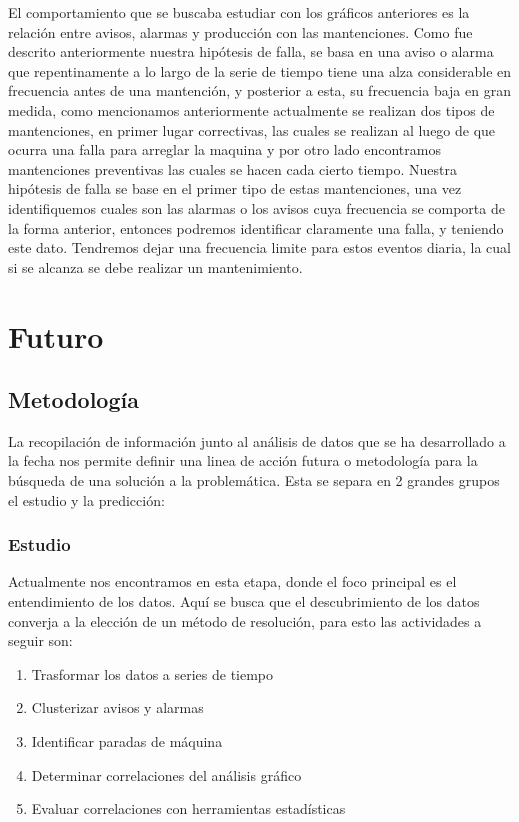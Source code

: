 \documentclass[10pt]{article}
\begin{document}
El comportamiento que se buscaba estudiar con los gráficos anteriores es la relación entre avisos, alarmas y producción con las mantenciones. Como fue descrito anteriormente nuestra hipótesis de falla, se basa en una aviso o alarma que repentinamente a lo largo de la serie de tiempo tiene una alza considerable en frecuencia antes de una mantención, y posterior a esta, su frecuencia baja en gran medida, como mencionamos anteriormente actualmente se realizan dos tipos de mantenciones, en primer lugar correctivas, las cuales se realizan al luego de que ocurra una falla para arreglar la maquina y por otro lado encontramos mantenciones preventivas las cuales se hacen cada cierto tiempo. Nuestra hipótesis de falla se base en el primer tipo de estas mantenciones, una vez identifiquemos cuales son las alarmas o los avisos cuya frecuencia se comporta de la forma anterior, entonces podremos identificar claramente una falla, y teniendo este dato. Tendremos dejar una frecuencia limite para estos eventos diaria, la cual si se alcanza se debe realizar un mantenimiento. %



\section{Futuro}

\subsection{Metodología}

La recopilación de información junto al análisis de datos que se ha desarrollado a la fecha nos permite definir una linea de acción futura o metodología para la búsqueda de una solución a la problemática. Esta se separa en 2 grandes grupos el estudio y la predicción:
 

\subsubsection{Estudio}
Actualmente nos encontramos en esta etapa, donde el foco principal es el entendimiento de los datos. Aquí se busca que el descubrimiento de los datos converja a la elección de un método de resolución, para esto las actividades a seguir son:
\begin{enumerate}
\item Trasformar los datos a series de tiempo
\item Clusterizar avisos y alarmas
\item Identificar paradas de máquina
\item Determinar correlaciones del análisis gráfico
\item Evaluar correlaciones con herramientas estadísticas 
\end{enumerate}
\end{document}
